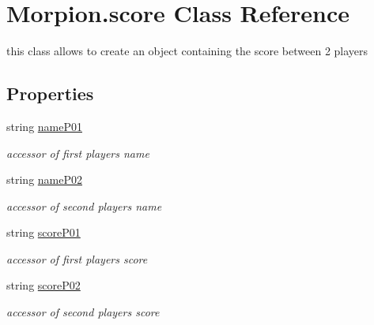 \hypertarget{class_morpion_1_1score}{}\section{Morpion.\+score Class Reference}
\label{class_morpion_1_1score}


this class allows to create an object containing the score between 2 players  


\subsection*{Properties}
\begin{DoxyCompactItemize}
\item 
string \hyperlink{class_morpion_1_1score_a728d07780c6fb5b6d7f84aee70e55d88}{name\+P01}
\begin{DoxyCompactList}\small\item\em accessor of first player\textquotesingle{}s name \end{DoxyCompactList}\item 
string \hyperlink{class_morpion_1_1score_a7b67d0e65e8ad0359b3e8e2c85eeae14}{name\+P02}
\begin{DoxyCompactList}\small\item\em accessor of second player\textquotesingle{}s name \end{DoxyCompactList}\item 
string \hyperlink{class_morpion_1_1score_a920c9f658cc89da0d0f3c5a507f8c68e}{score\+P01}
\begin{DoxyCompactList}\small\item\em accessor of first player\textquotesingle{}s score \end{DoxyCompactList}\item 
string \hyperlink{class_morpion_1_1score_ac4def44f86bf8aa7a8405273428f17cc}{score\+P02}
\begin{DoxyCompactList}\small\item\em accessor of second player\textquotesingle{}s score \end{DoxyCompactList}\end{DoxyCompactItemize}


